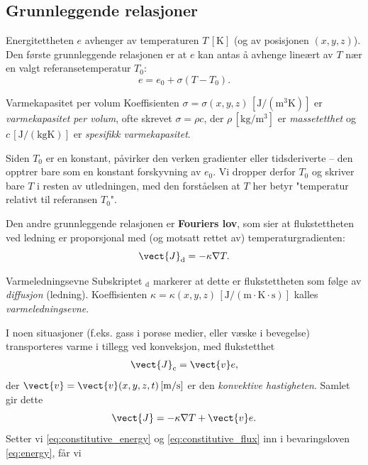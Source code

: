 \subsection*{Grunnleggende relasjoner}
Energitettheten \( e \) avhenger av temperaturen \( T \, [\mathrm{K}] \) (og av posisjonen $(x,y,z)$). Den første grunnleggende relasjonen er at \( e \) kan antas å avhenge lineært av \( T \) nær en valgt referansetemperatur \( T_0 \):
\begin{equation}
e = e_0 + \sigma (T - T_0).
\label{eq:constitutive_energy}
\end{equation}
\begin{defn}{Varmekapasitet per volum}
Koeffisienten \( \sigma = \sigma(x,y,z) \, [\mathrm{J/(m^3 K)}] \) er \emph{varmekapasitet per volum}, ofte skrevet \( \sigma = \rho c \), der \( \rho \, [\mathrm{kg/m^3}] \) er \emph{massetetthet} og \( c \, [\mathrm{J/(kg K)}] \) er \emph{spesifikk varmekapasitet}.
\end{defn}
Siden $T_0$ er en konstant, påvirker den verken gradienter eller tidsderiverte -- den opptrer bare som en konstant forskyvning av $e_0$. Vi dropper derfor $T_0$ og skriver bare $T$ i resten av utledningen, med den forståelsen at $T$ her betyr "temperatur relativt til referansen $T_0$".

Den andre grunnleggende relasjonen er \textbf{Fouriers lov}, som sier at flukstettheten ved ledning er proporsjonal med (og motsatt rettet av) temperaturgradienten:
\[
\vect{J}_\textrm{d} = -\kappa \nabla T.
\]
\begin{defn}{Varmeledningsevne}
Subskriptet $_\textrm{d}$ markerer at dette er flukstettheten som følge av \emph{diffusjon} (ledning). Koeffisienten \( \kappa = \kappa(x,y,z) \, [\mathrm{J/(m \cdot K \cdot s)}] \) kalles \emph{varmeledningsevne}.
\end{defn}
I noen situasjoner (f.eks. gass i porøse medier, eller væske i bevegelse) transporteres varme i tillegg ved konveksjon, med flukstetthet
\begin{align}
    \vect{J}_\textrm{c}=\vect{v}e, 
\end{align}
der \(\vect{v} = \vect{v}(x,y,z,t) \, [\mathrm{m/s}] \) er den \emph{konvektive hastigheten}. Samlet gir dette
\begin{equation}
\vect{J}= -\kappa \nabla T + \vect{v} e.
\label{eq:constitutive_flux}
\end{equation}
Setter vi \eqref{eq:constitutive_energy} og \eqref{eq:constitutive_flux} inn i bevaringsloven \eqref{eq:energy}, får vi

